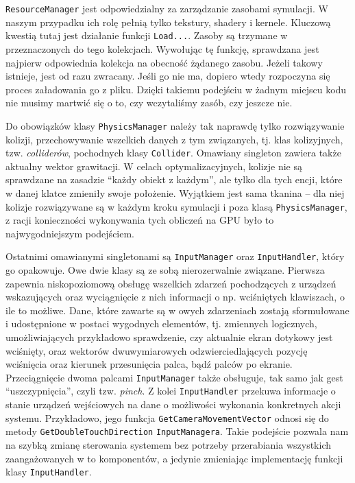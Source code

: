 	\texttt{ResourceManager} jest odpowiedzialny za zarządzanie zasobami symulacji. W naszym przypadku ich rolę pełnią tylko tekstury, shadery i kernele. Kluczową kwestią tutaj jest działanie funkcji \texttt{Load...}. Zasoby są trzymane w przeznaczonych do tego kolekcjach. Wywołując tę funkcję, sprawdzana jest najpierw odpowiednia kolekcja na obecność żądanego zasobu. Jeżeli takowy istnieje, jest od razu zwracany. Jeśli go nie ma, dopiero wtedy rozpoczyna się proces załadowania go z pliku. Dzięki takiemu podejściu w żadnym miejscu kodu nie musimy martwić się o to, czy wczytaliśmy zasób, czy jeszcze nie.
	
	Do obowiązków klasy \texttt{PhysicsManager} należy tak naprawdę tylko rozwiązywanie kolizji, przechowywanie wszelkich danych z tym związanych, tj. klas kolizyjnych, tzw. \emph{colliderów}, pochodnych klasy \texttt{Collider}. Omawiany singleton zawiera także aktualny wektor grawitacji. W celach optymalizacyjnych, kolizje nie są sprawdzane na zasadzie ``każdy obiekt z każdym'', ale tylko dla tych encji, które w danej klatce zmieniły swoje położenie. Wyjątkiem jest sama tkanina -- dla niej kolizje rozwiązywane są w każdym kroku symulacji i poza klasą \texttt{PhysicsManager}, z racji konieczności wykonywania tych obliczeń na GPU było to najwygodniejszym podejściem.
	
	Ostatnimi omawianymi singletonami są \texttt{InputManager} oraz \texttt{InputHandler}, który go opakowuje. Owe dwie klasy są ze sobą nierozerwalnie związane. Pierwsza zapewnia niskopoziomową obsługę wszelkich zdarzeń pochodzących z urządzeń wskazujących oraz wyciągnięcie z nich informacji o np. wciśniętych klawiszach, o ile to możliwe. Dane, które zawarte są w owych zdarzeniach zostają sformułowane i udostępnione w postaci wygodnych elementów, tj. zmiennych logicznych, umożliwiających przykładowo sprawdzenie, czy aktualnie ekran dotykowy jest wciśnięty, oraz wektorów dwuwymiarowych odzwierciedlających pozycję wciśnięcia oraz kierunek przesunięcia palca, bądź palców po ekranie. Przeciągnięcie dwoma palcami \texttt{InputManager} także obsługuje, tak samo jak gest ``uszczypnięcia'', czyli tzw. \emph{pinch}. Z kolei \texttt{InputHandler} przekuwa informacje o stanie urządzeń wejściowych na dane o możliwości wykonania konkretnych akcji systemu. Przykładowo, jego funkcja \texttt{GetCameraMovementVector} odnosi się do metody \texttt{GetDoubleTouchDirection} \texttt{InputManagera}. Takie podejście pozwala nam na szybką zmianę sterowania systemem bez potrzeby przerabiania wszystkich zaangażowanych w to komponentów, a jedynie zmieniając implementację funkcji klasy \texttt{InputHandler}. 
	
